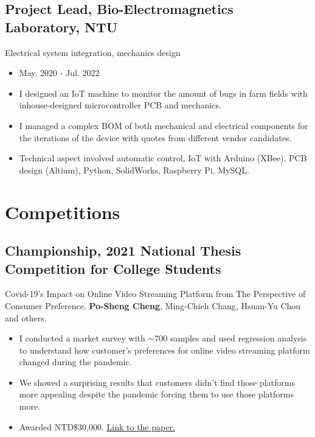 \documentclass[12pt]{article}
\begin{document}
        \subsection*{Project Lead, Bio-Electromagnetics Laboratory, NTU}
        {\sffamily
        Electrical system integration, mechanics design
        \begin{itemize}
            \item May. 2020 - Jul. 2022
            \item I designed an IoT machine to monitor the amount of bugs in farm fields with inhouse-designed microcontroller PCB and mechanics.
            \item I managed a complex BOM of both mechanical and electrical components for the iterations of the device with quotes from different vendor candidates.
            \item Technical aspect involved automatic control, IoT with Arduino (XBee), PCB design (Altium), Python, SolidWorks, Raspberry Pi, MySQL.
        \end{itemize}
        }
        \section*{Competitions}
        \subsection*{Championship, 2021 National Thesis Competition for College Students}
        {\sffamily
        {\footnotesize Covid-19's Impact on Online Video Streaming Platform from The Perspective of Consumer Preference. \textbf{Po-Sheng Cheng}, Ming-Chieh Chang, Hsuan-Yu Chou and others.}
        \begin{itemize}
            \item I conducted a market survey with $\sim$700 samples and used regression analysis to understand how customer's preferences for online video streaming platform changed during the pandemic.
            \item We showed a surprising results that customers didn't find those platforms more appealing despite the pandemic forcing them to use those platforms more.
            \item Awarded NTD\$30,000. \href{https://bencer3283.github.io/research/covidthesis/}{\underline{Link to the paper.}}
        \end{itemize}
        }
\end{document}
